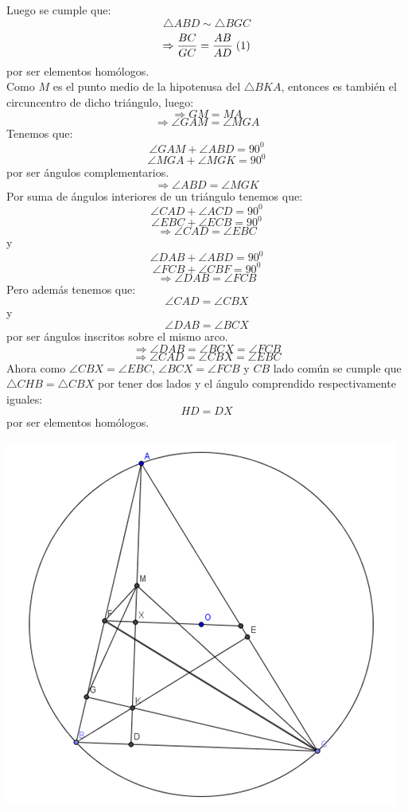 \documentclass{book}
\begin{document}
\begin{enumerate}
\begin{center}
          \end{center}
          Luego se cumple que:
          $$\triangle ABD\sim\triangle BGC$$
          $$\Rightarrow{BC\over GC}={AB\over AD} \; (1)$$
          por ser elementos homólogos.\\
          Como $M$ es el punto medio de la hipotenusa del $\triangle BKA$, entonces es también el circuncentro de dicho triángulo, luego:
          $$\Rightarrow GM=MA$$
          $$\Rightarrow\angle GAM=\angle MGA$$
          Tenemos que:
          $$\angle GAM+\angle ABD=90^0$$
          $$\angle MGA+\angle MGK=90^0$$
          por ser ángulos complementarios.
          $$\Rightarrow\angle ABD=\angle MGK$$
          Por suma de ángulos interiores de un triángulo tenemos que:
          $$\angle CAD+\angle ACD=90^0$$
          $$\angle EBC+\angle ECB=90^0$$
          $$\Rightarrow\angle CAD=\angle EBC$$
          y
          $$\angle DAB+\angle ABD=90^0$$
          $$\angle FCB+\angle CBF=90^0$$
          $$\Rightarrow\angle DAB=\angle FCB$$
          Pero además tenemos que:
          $$\angle CAD=\angle CBX$$
          y
          $$\angle DAB=\angle BCX$$
          por ser ángulos inscritos sobre el mismo arco.
          $$\Rightarrow\angle DAB=\angle BCX=\angle FCB$$
          $$\Rightarrow\angle CAD=\angle CBX=\angle EBC$$
          Ahora como $\angle CBX=\angle EBC$, $\angle BCX=\angle FCB$ y $CB$ lado común se cumple que $\triangle CHB=\triangle CBX$ por tener dos lados y el ángulo comprendido respectivamente iguales:
          $$HD=DX$$
          por ser elementos homólogos.
          \begin{center}
              \includegraphics[scale=1]{imagenes/Geometria/21,2.png}

\end{center}
\end{enumerate}
\end{document}
